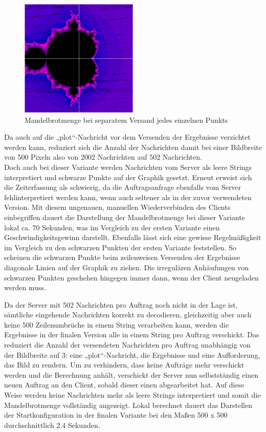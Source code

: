 \documentclass[12pt, onecolumn,notitlepage]{scrartcl}
\begin{document}
\begin{figure}[htbp] 
	\centering
	\includegraphics[width=0.5\textwidth]{zeilenVersandt.PNG}
	\caption{Mandelbrotmenge bei separatem Versand jedes einzelnen Punkts}
	\label{fig:Bild2}
\end{figure}

Da auch auf die „plot“-Nachricht vor dem Versenden der Ergebnisse verzichtet werden kann, reduziert sich die Anzahl der Nachrichten damit bei einer Bildbreite von 500 Pixeln also von 2002 Nachrichten auf 502 Nachrichten.\\
Doch auch bei dieser Variante werden Nachrichten vom Server als leere Strings interpretiert und schwarze Punkte auf der Graphik gesetzt. Erneut erweist sich die Zeiterfassung als schwierig, da die Auftragsanfrage ebenfalls vom Server fehlinterpretiert werden kann, wenn auch seltener als in der zuvor verwendeten Version. Mit diesem ungenauen, manuellen Wiederverbinden des Clients einbegriffen dauert die Darstellung der Mandelbrotmenge bei dieser Variante lokal ca. 70 Sekunden, was im Vergleich zu der ersten Variante einen Geschwindigkeitsgewinn darstellt. Ebenfalls lässt sich eine gewisse Regelmäßigkeit im Vergleich zu den schwarzen Punkten der ersten Variante feststellen. So scheinen die schwarzen Punkte beim zeilenweisen Versenden der Ergebnisse  diagonale Linien auf der Graphik zu ziehen. Die irregulären Anhäufungen von schwarzen Punkten geschehen hingegen immer dann, wenn der Client neugeladen werden muss. \par
Da der Server mit 502 Nachrichten pro Auftrag noch nicht in der Lage ist, sämtliche eingehende Nachrichten korrekt zu decodieren, gleichzeitig aber auch keine 500 Zeilenumbrüche in einem String verarbeiten kann, werden die Ergebnisse in der finalen Version alle in einem String pro Auftrag verschickt. Das reduziert die Anzahl der versendeten Nachrichten pro Auftrag unabhängig von der Bildbreite auf 3: eine „plot“-Nachricht, die Ergebnisse und eine Aufforderung, das Bild zu rendern. Um zu verhindern, dass keine Aufträge mehr verschickt werden und die Berechnung anhält, verschickt der Server nun selbstständig einen neuen Auftrag an den Client, sobald dieser einen abgearbeitet hat. Auf diese Weise werden keine Nachrichten mehr als leere Strings interpretiert und somit die Mandelbrotmenge vollständig angezeigt. Lokal berechnet dauert das Darstellen der Startkonfiguration in der finalen Variante bei den Maßen 500 x 500 durchschnittlich 2.4 Sekunden.\par
\end{document}
